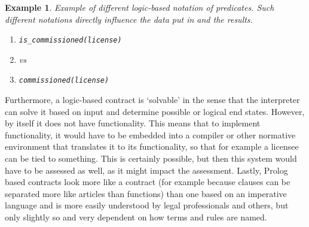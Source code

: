 \documentclass[conference]{IEEEtran}
\newtheorem{example}{Example}
\begin{document}
\begin{example}\label{ex:logic_standard}
Example of different logic-based notation of predicates. Such different notations directly influence the data put in and the results.
\begin{enumerate}[leftmargin=*]
\item[] \verb|is_commissioned(license)|
\item[] vs
\item[] \verb|commissioned(license)|
\end{enumerate}
\end{example}
Furthermore, a logic-based contract is ‘solvable’ in the sense that the interpreter can solve it based on input and determine possible or logical end states. However, by itself it does not have functionality. This means that to implement functionality, it would have to be embedded into a compiler or other normative environment that translates it to its functionality, so that for example a licensee can be tied to something. This is certainly possible, but then this system would have to be assessed as well, as it might impact the assessment. Lastly, Prolog based contracts look more like a contract (for example because clauses can be separated more like articles than functions) than one based on an imperative language and is more easily understood by legal professionals and others, but only slightly so and very dependent on how terms and rules are named.
\end{document}
